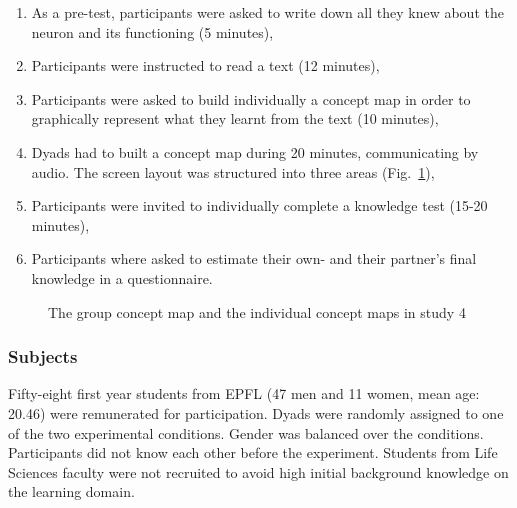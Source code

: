 \documentclass[natbib]{svjour3}
\begin{document}
\begin{enumerate}

    \item As a pre-test, participants were asked to write down all they knew
        about the neuron and its functioning (5 minutes),

    \item Participants were instructed to read a text (12 minutes),

    \item Participants were asked to build individually a concept map in order to
        graphically represent what they learnt from the text (10 minutes),

    \item Dyads had to built a concept map during 20 minutes, communicating by
        audio.  The screen layout was structured into three areas
        (Fig.~\ref{study4:concept_map}),

    \item Participants were invited to individually complete a knowledge test
        (15-20 minutes),

    \item Participants where asked to estimate their own- and their partner's
        final knowledge in a questionnaire. 

\end{enumerate}



\begin{figure}
    \centering
    \caption{The group concept map and the individual concept maps in study
    4}
    \label{study4:concept_map}
\end{figure}

\subsubsection*{Subjects}

Fifty-eight first year students from EPFL (47 men and 11 women, mean age: 20.46)
were remunerated for participation. Dyads were randomly assigned to one of the
two experimental conditions. Gender was balanced over the conditions.
Participants did not know each other before the experiment. Students from Life
Sciences faculty were not recruited to avoid high initial background knowledge on the
learning domain.
\end{document}
